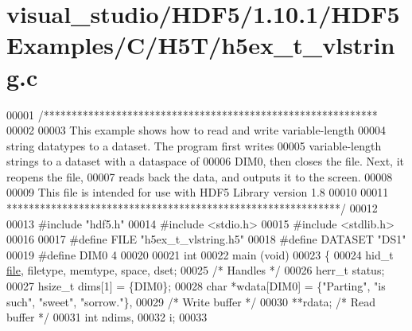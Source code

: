 \hypertarget{visual__studio_2_h_d_f5_21_810_81_2_h_d_f5_examples_2_c_2_h5_t_2h5ex__t__vlstring_8c_source}{}\section{visual\+\_\+studio/\+H\+D\+F5/1.10.1/\+H\+D\+F5\+Examples/\+C/\+H5\+T/h5ex\+\_\+t\+\_\+vlstring.c}
\label{visual__studio_2_h_d_f5_21_810_81_2_h_d_f5_examples_2_c_2_h5_t_2h5ex__t__vlstring_8c_source}

\begin{DoxyCode}
00001 \textcolor{comment}{/************************************************************}
00002 \textcolor{comment}{}
00003 \textcolor{comment}{  This example shows how to read and write variable-length}
00004 \textcolor{comment}{  string datatypes to a dataset.  The program first writes}
00005 \textcolor{comment}{  variable-length strings to a dataset with a dataspace of}
00006 \textcolor{comment}{  DIM0, then closes the file.  Next, it reopens the file,}
00007 \textcolor{comment}{  reads back the data, and outputs it to the screen.}
00008 \textcolor{comment}{}
00009 \textcolor{comment}{  This file is intended for use with HDF5 Library version 1.8}
00010 \textcolor{comment}{}
00011 \textcolor{comment}{ ************************************************************/}
00012 
00013 \textcolor{preprocessor}{#include "hdf5.h"}
00014 \textcolor{preprocessor}{#include <stdio.h>}
00015 \textcolor{preprocessor}{#include <stdlib.h>}
00016 
00017 \textcolor{preprocessor}{#define FILE            "h5ex\_t\_vlstring.h5"}
00018 \textcolor{preprocessor}{#define DATASET         "DS1"}
00019 \textcolor{preprocessor}{#define DIM0            4}
00020 
00021 \textcolor{keywordtype}{int}
00022 main (\textcolor{keywordtype}{void})
00023 \{
00024     hid\_t       \hyperlink{structfile}{file}, filetype, memtype, space, dset;
00025                                             \textcolor{comment}{/* Handles */}
00026     herr\_t      status;
00027     hsize\_t     dims[1] = \{DIM0\};
00028     \textcolor{keywordtype}{char}        *wdata[DIM0] = \{\textcolor{stringliteral}{"Parting"}, \textcolor{stringliteral}{"is such"}, \textcolor{stringliteral}{"sweet"}, \textcolor{stringliteral}{"sorrow."}\},
00029                                             \textcolor{comment}{/* Write buffer */}
00030                 **rdata;                    \textcolor{comment}{/* Read buffer */}
00031     \textcolor{keywordtype}{int}         ndims,
00032                 i;
00033 

\end{DoxyCode}
